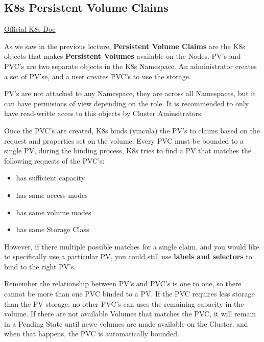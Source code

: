 \documentclass{article}
\newenvironment{blocktemplateIII}[1]{%
    \tcolorbox[beamer,%
    noparskip,breakable,
    ,colframe=Red,%
    colbacklower=LimeGreen!75!LightGreen,%
    title=#1]}%
    {\endtcolorbox}
\begin{document}
\subsection{K8s Persistent Volume Claims}

\href{https://kubernetes.io/docs/concepts/storage/persistent-volumes/#persistentvolumeclaims}{Official K8s Doc}

As we saw in the previous lecture, \textbf{Persistent Volume Claims} are the K8s objects that makes \textbf{Persistent Volumes} available on the Nodes. PV's and PVC's are two separate objects in the K8s Namespace. An administrator creates a set of PV'se, and a user creates PVC's to use the storage.

\begin{blocktemplateIII}{WARNING}
PV's are not attached to any Namespace, they are across all Namespaces, but it can have permisions of view depending on the role. It is recommended to only have read-writte acces to this objects by Cluster Aminsitrators.
\end{blocktemplateIII}

Once the PVC's are created, K8s binds (vincula) the PV's to claims based on the request and properties set on the volume. Every PVC must be bounded to a single PV, during the binding process, K8s tries to find a PV that matches the following requests of the PVC's:

\begin{itemize}
    \item has sufficient capacity
    \item has same access modes
    \item has same volume modes
    \item has same Storage Class
\end{itemize}

However, if there multiple possible matches for a single claim, and you would like to specifically use a particular PV, you could still use \textbf{labels and selectors} to bind to the right PV's.

\begin{blocktemplateIII}{WARNING}
Remember the relationship between PV's and PVC's is one to one, so there cannot be more than one PVC binded to a PV. If the PVC requires less storage than the PV storage, no other PVC's can uses the remaining capacity in the volume. If there are not available Volumes that matches the PVC, it will remain in a Pending State until newe volumes are made available on the Cluster, and when that happens, the PVC is automatically bounded.
\end{blocktemplateIII}
\end{document}
